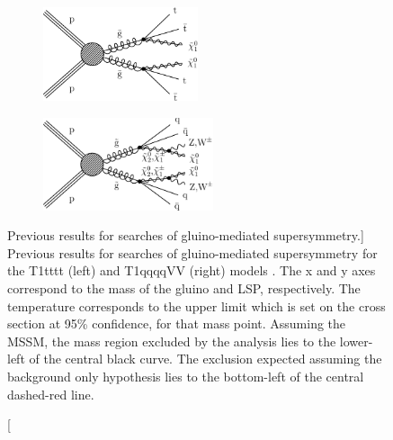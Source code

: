 \begin{figure}
\begin{subfigure}{0.45\textwidth}
\centering
\includegraphics[width=0.5\textwidth]{figs/CMS-SUS-16-033_Figure_001-a.pdf}  
\end{subfigure}
\begin{subfigure}{0.45\textwidth}
\centering
\includegraphics[width=0.55\textwidth]{figs/CMS-SUS-16-033_Figure_001-c.pdf}
\end{subfigure}
\caption
[Previous results for searches of gluino-mediated supersymmetry.]
{Previous results for searches of gluino-mediated supersymmetry for the T1tttt (left) and T1qqqqVV (right) models \cite{CMS-SUS-16-033}.  The x and y axes correspond to the mass of the gluino and LSP, respectively. The temperature corresponds to the upper limit which is set on the cross section at 95\% confidence, for that mass point. Assuming the MSSM, the mass region excluded by the analysis lies to the lower-left of the central black curve. The exclusion expected assuming the background only hypothesis lies to the bottom-left of the central dashed-red line.}
\label{fig:oldlimits}
\end{figure} 
